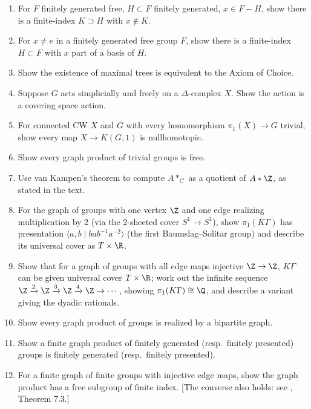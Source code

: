 \begin{enumerate}
\item For $F$ finitely generated free, $H\subset F$ finitely generated, $x\in F-H$, show
there is a finite-index $K\supset H$ with $x\notin K$.

\item For $x\ne e$ in a finitely generated free group $F$, show there is a finite-index
$H\subset F$ with $x$ part of a basis of $H$.

\item Show the existence of maximal trees is equivalent to the Axiom of Choice.

\item Suppose $G$ acts simplicially and freely on a $\Delta$-complex $X$. Show the
action is a covering space action.

\item For connected CW $X$ and $G$ with every homomorphism $\pi_1(X)\to G$
trivial, show every map $X\to K(G,1)$ is nullhomotopic.

\item Show every graph product of trivial groups is free.

\item Use van Kampen's theorem to compute $A*_C$ as a quotient of $A*\Z$, as
stated in the text.

\item For the graph of groups with one vertex $\Z$ and one edge realizing
multiplication by 2 (via the 2-sheeted cover $S^1\to S^1$), show $\pi_1(K\Gamma)$ has
presentation $\langle a,b\mid bab^{-1}a^{-2}\rangle$ (the first Baumslag--Solitar group) and
describe its universal cover as $T\times\R$.

\item Show that for a graph of groups with all edge maps injective $\Z\to\Z$, $K\Gamma$
can be given universal cover $T\times\R$; work out the infinite sequence
$\Z\xrightarrow{2}\Z\xrightarrow{3}\Z\xrightarrow{4}\Z\to\cdots$, showing $\pi_1(K\Gamma)\cong\Q$, and
describe a variant giving the dyadic rationals.

\item Show every graph product of groups is realized by a bipartite graph.

\item Show a finite graph product of finitely generated (resp.\ finitely presented)
groups is finitely generated (resp.\ finitely presented).

\item For a finite graph of finite groups with injective edge maps, show the graph
product has a free subgroup of finite index. [The converse also holds: see
\cite{ScottWall1979}, Theorem 7.3.]
\end{enumerate}
